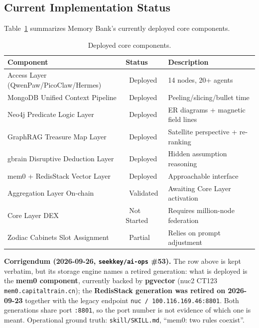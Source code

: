 \documentclass[11pt,a4paper]{article}
\newcommand{\cmark}{\ding{51}}%
\newcommand{\xmark}{\ding{55}}%
\newcommand{\warn}{\raisebox{0.2ex}{\textbf{!}}}
\begin{document}
\subsection{Current Implementation Status}
\label{sub:status}

Table~\ref{tab:components} summarizes Memory Bank's currently deployed core components.

\begin{table}[ht]
\centering
\caption{Deployed core components.}
\label{tab:components}
\small
\begin{tabular}{@{}llp{5.5cm}@{}}
\toprule
\textbf{Component} & \textbf{Status} & \textbf{Description} \\
\midrule
Access Layer (QwenPaw/PicoClaw/Hermes) & \cmark\ Deployed & 14 nodes, 20+ agents \\
MongoDB Unified Context Pipeline & \cmark\ Deployed & Peeling/slicing/bullet time \\
Neo4j Predicate Logic Layer & \cmark\ Deployed & ER diagrams + magnetic field lines \\
GraphRAG Treasure Map Layer & \cmark\ Deployed & Satellite perspective + re-ranking \\
gbrain Disruptive Deduction Layer & \cmark\ Deployed & Hidden assumption reasoning \\
mem0 + RedisStack Vector Layer & \cmark\ Deployed & Approachable interface \\
Aggregation Layer On-chain & \warn\ Validated & Awaiting Core Layer activation \\
Core Layer DEX & \xmark\ Not Started & Requires million-node federation \\
Zodiac Cabinets Slot Assignment & \warn\ Partial & Relies on prompt adjustment \\
\bottomrule
\end{tabular}
\end{table}

\noindent\footnotesize\textbf{Corrigendum (2026-09-26, \texttt{seekkey/ai-ops} \#53).}
The row above is kept verbatim, but its storage engine names a retired generation:
what is deployed is the \textbf{mem0 component}, currently backed by \textbf{pgvector}
(nuc2 CT123 \textrm{\texttt{mem0.capitaltrain.cn}}); the \textbf{RedisStack generation was
retired on 2026-09-23} together with the legacy endpoint \texttt{nuc / 100.116.169.46:8801}.
Both generations share port \texttt{:8801}, so the port number is not evidence of which one is meant.
Operational ground truth: \texttt{skill/SKILL.md}, ``mem0: two rules coexist''.\normalsize
\end{document}
